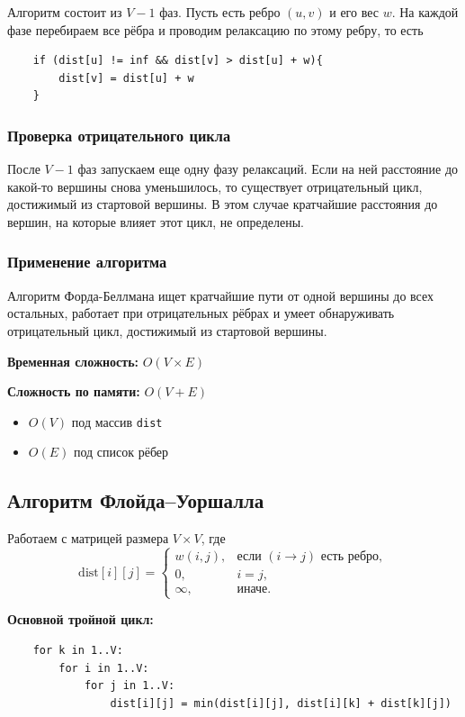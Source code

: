 \documentclass[a4paper]{article}
\begin{document}
Алгоритм состоит из $V-1$ фаз. Пусть есть ребро $(u,v)$ и его вес $w$. На каждой фазе перебираем все рёбра и проводим релаксацию по этому ребру, то есть

\begin{lstlisting}
    if (dist[u] != inf && dist[v] > dist[u] + w){
        dist[v] = dist[u] + w
    }
\end{lstlisting}

\subsubsection*{Проверка отрицательного цикла}
После $V-1$ фаз запускаем еще одну фазу релаксаций. Если на ней расстояние до какой-то вершины снова уменьшилось, то существует отрицательный цикл, достижимый из стартовой вершины. В этом случае кратчайшие расстояния до вершин, на которые влияет этот цикл, не определены.

\subsubsection*{Применение алгоритма}
Алгоритм Форда-Беллмана ищет кратчайшие пути от одной вершины до всех остальных, работает при отрицательных рёбрах и умеет обнаруживать отрицательный цикл, достижимый из стартовой вершины.

\textbf{Временная сложность:} $O(V \times E)$

\textbf{Сложность по памяти:} $O(V + E)$ 

\begin{itemize}
    \item $O(V)$ под массив \texttt{dist}
    \item $O(E)$ под список рёбер
\end{itemize}


\subsection{Алгоритм Флойда–Уоршалла}
Работаем с матрицей размера $V\times V$, где
\[
  \mathrm{dist}[i][j] =
    \begin{cases}
      w(i,j), & \text{если }(i\to j)\text{ есть ребро},\\
      0,      & i=j,\\
      \infty,& \text{иначе}.
    \end{cases}
\]

\textbf{Основной тройной цикл:}

\begin{lstlisting}
    for k in 1..V:
        for i in 1..V:
            for j in 1..V:
                dist[i][j] = min(dist[i][j], dist[i][k] + dist[k][j])

\end{lstlisting}
\end{document}
